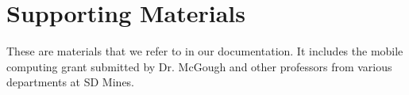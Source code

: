 \chapter{Supporting Materials}
\label{ch:support}

These are materials that we refer to in our documentation. It includes the 
mobile computing grant submitted by Dr. McGough and other professors from 
various departments at SD Mines.


